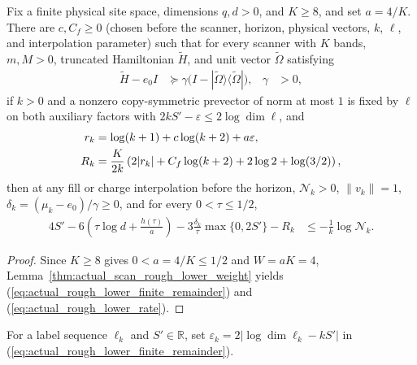 \begin{lemma}
    \label{thm:actual_scan_rough_lower_norm}
    \leanok
    Fix a finite physical site space, dimensions $q,d>0$, and $K\geq8$, and set
    $a=4/K$. There are $c,C_f\geq0$ (chosen before the scanner, horizon,
    physical vectors, $k$, $\ell$, and interpolation parameter) such that for
    every scanner with $K$ bands, $m,M>0$, truncated Hamiltonian
    $\widetilde H$, and unit vector $\widetilde\Omega$ satisfying
    \begin{align}
        \widetilde H-e_0 I
         & \succeq\gamma
        \bigl(I-|\widetilde\Omega\rangle
        \langle\widetilde\Omega|\bigr),
         & \gamma        & >0,
        \label{eq:actual_rough_lower_gap}
    \end{align}
    if $k>0$ and a nonzero copy-symmetric prevector of norm at most $1$ is
    fixed by $\ell$ on both auxiliary factors with
    $2kS'-\varepsilon\leq2\log\dim\ell$, and
    \begin{align}
        r_k & =\log(k+1)+c\log(k+2)+a\varepsilon,\notag \\
        R_k & =\frac{K}{2k}
        \left(2|r_k|+C_f\log(k+2)+2\log2+\log(3/2)\right),
        \label{eq:actual_rough_lower_finite_remainder}
    \end{align}
    then at any fill or charge interpolation before the horizon,
    $\mathcal N_k>0$, $\|v_k\|=1$, $\delta_k=(\mu_k-e_0)/\gamma\geq0$, and for
    every $0<\tau\leq1/2$,
    \begin{align}
        4S'-6\left(\tau\log d+\frac{h(\tau)}a\right)
        -3\frac{\delta_k}{\tau}\max\{0,2S'\}-R_k
         & \leq-\frac1k\log\mathcal N_k.
        \label{eq:actual_rough_lower_rate}
    \end{align}
\end{lemma}

\begin{proof}
    \leanok
    Since $K\geq8$ gives $0<a=4/K\leq1/2$ and $W=aK=4$,
    Lemma~\ref{thm:actual_scan_rough_lower_weight} yields
    (\ref{eq:actual_rough_lower_finite_remainder}) and
    (\ref{eq:actual_rough_lower_rate}).
\end{proof}

\begin{definition}
    \label{def:actual_rough_lower_remainder}
    \leanok
    For a label sequence $\ell_k$ and $S'\in\mathbb R$, set
    $\varepsilon_k=2|\log\dim\ell_k-kS'|$ in
    (\ref{eq:actual_rough_lower_finite_remainder}).
\end{definition}

